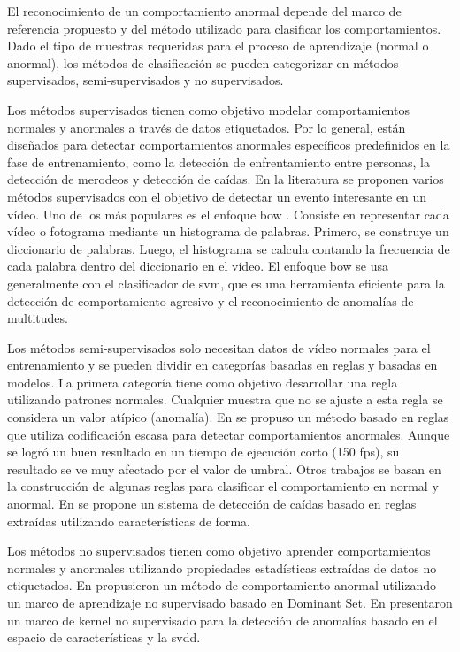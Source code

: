 El reconocimiento de un comportamiento anormal depende del marco de referencia propuesto y del método utilizado para clasificar los comportamientos. Dado el tipo de muestras requeridas para el proceso de aprendizaje (normal o anormal), los métodos de clasificación se pueden categorizar en métodos supervisados, semi-supervisados y no supervisados.

Los métodos supervisados tienen como objetivo modelar comportamientos normales y anormales a través de datos etiquetados. Por lo general, están diseñados para detectar comportamientos anormales específicos predefinidos en la fase de entrenamiento, como la detección de enfrentamiento entre personas, la detección de merodeos y detección de caídas. En la literatura se proponen varios métodos supervisados con el objetivo de detectar un evento interesante en un vídeo. Uno de los más populares es el enfoque \gls{bow} \cite{ACAMPORA2015130}. Consiste en representar cada vídeo o fotograma mediante un histograma de palabras. Primero, se construye un diccionario de palabras. Luego, el histograma se calcula contando la frecuencia de cada palabra dentro del diccionario en el vídeo. El enfoque \gls{bow} se usa generalmente con el clasificador de \gls{svm}, que es una herramienta eficiente para la detección de comportamiento agresivo y el reconocimiento de anomalías de multitudes.

Los métodos semi-supervisados solo necesitan datos de vídeo normales para el entrenamiento y se pueden dividir en categorías basadas en reglas y basadas en modelos. La primera categoría tiene como objetivo desarrollar una regla utilizando patrones normales. Cualquier muestra que no se ajuste a esta regla se considera un valor atípico (anomalía). En \cite{6751449} se propuso un método basado en reglas que utiliza codificación escasa para detectar comportamientos anormales. Aunque se logró un buen resultado en un tiempo de ejecución corto (150 \gls{fps}), su resultado se ve muy afectado por el valor de umbral. Otros trabajos se basan en la construcción de algunas reglas para clasificar el comportamiento en normal y anormal. En \cite{6931308} se propone un sistema de detección de caídas basado en reglas extraídas utilizando características de forma.

Los métodos no supervisados tienen como objetivo aprender comportamientos normales y anormales utilizando propiedades estadísticas extraídas de datos no etiquetados. En \cite{alvar2014} propusieron un método de comportamiento anormal utilizando un marco de aprendizaje no supervisado basado en Dominant Set. En \cite{Ren2013UnsupervisedKL} presentaron un marco de kernel no supervisado para la detección de anomalías basado en el espacio de características y la \gls{svdd}.


